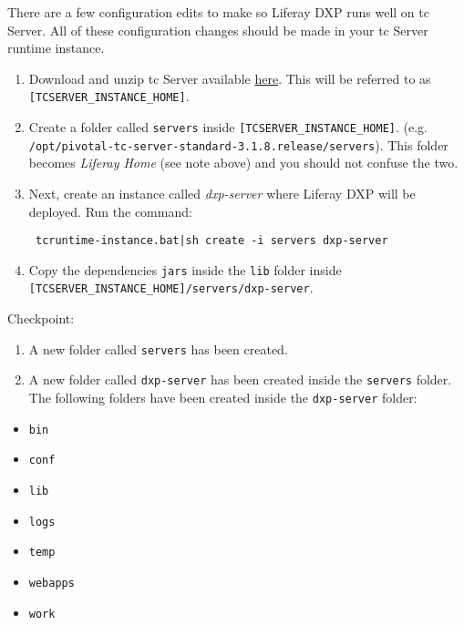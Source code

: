 There are a few configuration edits to make so Liferay DXP runs well on
tc Server. All of these configuration changes should be made in your tc
Server runtime instance.

\begin{enumerate}
\def\labelenumi{\arabic{enumi}.}
\item
  Download and unzip tc Server available
  \href{https://network.pivotal.io/products/pivotal-tcserver}{here}.
  This will be referred to as \texttt{{[}TCSERVER\_INSTANCE\_HOME{]}}.
\item
  Create a folder called \texttt{servers} inside
  \texttt{{[}TCSERVER\_INSTANCE\_HOME{]}}. (e.g.
  \texttt{/opt/pivotal-tc-server-standard-3.1.8.release/servers}). This
  folder becomes \emph{Liferay Home} (see note above) and you should not
  confuse the two.
\item
  Next, create an instance called \emph{dxp-server} where Liferay DXP
  will be deployed. Run the command:

\begin{verbatim}
 tcruntime-instance.bat|sh create -i servers dxp-server
\end{verbatim}
\item
  Copy the dependencies \texttt{jars} inside the \texttt{lib} folder
  inside \texttt{{[}TCSERVER\_INSTANCE\_HOME{]}/servers/dxp-server}.
\end{enumerate}

Checkpoint:

\begin{enumerate}
\def\labelenumi{\arabic{enumi}.}
\item
  A new folder called \texttt{servers} has been created.
\item
  A new folder called \texttt{dxp-server} has been created inside the
  \texttt{servers} folder. The following folders have been created
  inside the \texttt{dxp-server} folder:
\end{enumerate}

\begin{itemize}
\tightlist
\item
  \texttt{bin}
\item
  \texttt{conf}
\item
  \texttt{lib}
\item
  \texttt{logs}
\item
  \texttt{temp}
\item
  \texttt{webapps}
\item
  \texttt{work}
\end{itemize}

